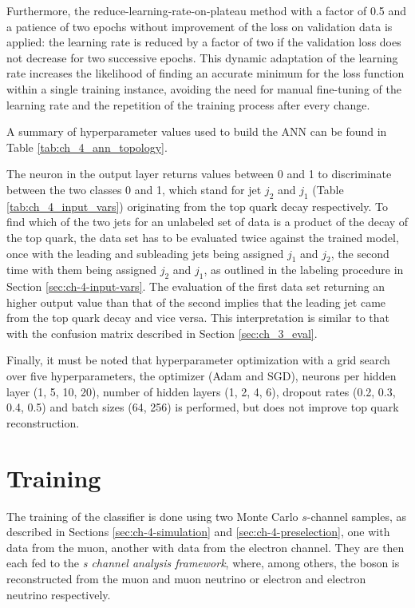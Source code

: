 Furthermore, the reduce-learning-rate-on-plateau method with a factor of 0.5 and a patience of two epochs without improvement of the loss on validation data is applied: the learning rate is reduced by a factor of two if the validation loss does not decrease for two successive epochs. This dynamic adaptation of the learning rate increases the likelihood of finding an accurate minimum for the loss function within a single training instance, avoiding the need for manual fine-tuning of the learning rate and the repetition of the training process after every change.

A summary of hyperparameter values used to build the ANN can be found in Table \ref{tab:ch_4_ann_topology}.

The neuron in the output layer returns values between 0 and 1 to discriminate between the two classes 0 and 1, which stand for jet $j_2$ and $j_1$ (Table \ref{tab:ch_4_input_vars}) originating from the top quark decay respectively. To find which of the two \Pbottom jets for an unlabeled set of data is a product of the decay of the top quark, the data set has to be evaluated twice against the trained model, once with the leading and subleading jets being assigned $j_1$ and $j_2$, the second time with them being assigned $j_2$ and $j_1$, as outlined in the labeling procedure in Section \ref{sec:ch-4-input-vars}. The evaluation of the first data set returning an higher output value than that of the second implies that the leading jet came from the top quark decay and vice versa. This interpretation is similar to that with the confusion matrix described in Section \ref{sec:ch_3_eval}.

Finally, it must be noted that hyperparameter optimization with a grid search over five hyperparameters, the optimizer (Adam and SGD), neurons per hidden layer (1, 5, 10, 20), number of hidden layers (1, 2, 4, 6), dropout rates (0.2, 0.3, 0.4, 0.5) and batch sizes (64, 256) is performed, but does not improve top quark reconstruction.

\section{Training}
\label{sec:ch-4-training}
The training of the classifier is done using two Monte Carlo $s$-channel samples, as described in Sections \ref{sec:ch-4-simulation} and \ref{sec:ch-4-preselection}, one with data from the muon, another with data from the electron channel. They are then each fed to the \emph{s channel analysis framework}, where, among others, the \PW boson is reconstructed from the muon and muon neutrino or electron and electron neutrino respectively.

